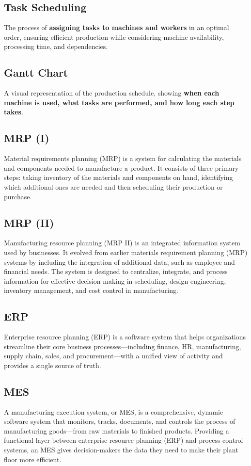 \subsection{Task Scheduling}
The process of \textbf{assigning tasks to machines and workers} in an optimal order, ensuring efficient production while considering machine availability, processing time, and dependencies.

\subsection{Gantt Chart}
A visual representation of the production schedule, showing \textbf{when each machine is used, what tasks are performed, and how long each step takes}.

\subsection{MRP (I)} Material requirements planning (MRP) is a system for calculating the materials and components needed to manufacture a product. It consists of three primary steps: taking inventory of the materials and components on hand, identifying which additional ones are needed and then scheduling their production or purchase. \cite{techtarget_mrp}

\subsection{MRP (II)} Manufacturing resource planning (MRP II) is an integrated information system used by businesses. It evolved from earlier materials requirement planning (MRP) systems by including the integration of additional data, such as employee and financial needs. The system is designed to centralize, integrate, and process information for effective decision-making in scheduling, design engineering, inventory management, and cost control in manufacturing. \cite{investopedia_mrpii}

\subsection{ERP} Enterprise resource planning (ERP) is a software system that helps organizations streamline their core business processes—including finance, HR, manufacturing, supply chain, sales, and procurement—with a unified view of activity and provides a single source of truth. \cite{sap_erp}

\subsection{MES} A manufacturing execution system, or MES, is a comprehensive, dynamic software system that monitors, tracks, documents, and controls the process of manufacturing goods—from raw materials to finished products. Providing a functional layer between enterprise resource planning (ERP) and process control systems, an MES gives decision-makers the data they need to make their plant floor more efficient. \cite{sap_mes}